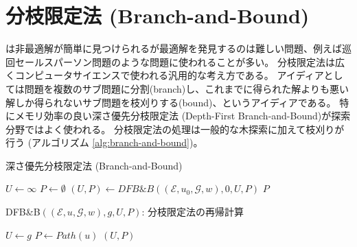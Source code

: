 \section{分枝限定法 (Branch-and-Bound)}
\label{sec:branch-and-bound}

は非最適解が簡単に見つけられるが最適解を発見するのは難しい問題、例えば巡回セールスパーソン問題のような問題に使われることが多い。
分枝限定法は広くコンピュータサイエンスで使われる汎用的な考え方である。
アイディアとしては問題を複数のサブ問題に分割(branch)し、これまでに得られた解よりも悪い解しか得られないサブ問題を枝刈りする(bound)、というアイディアである。
特にメモリ効率の良い深さ優先分枝限定法 (Depth-First Branch-and-Bound)が探索分野ではよく使われる。
分枝限定法の処理は一般的な木探索に加えて枝刈りが行う (アルゴリズム \ref{alg:branch-and-bound})。

\begin{algorithm}
\caption{深さ優先分枝限定法 (Branch-and-Bound)}
\label{alg:branch-and-bound}
	$U \leftarrow \infty$\;
	$P \leftarrow \emptyset$\;
	$(U, P) \leftarrow DFB\&B((\mathcal{E}, u_0, \mathcal{G}, w), 0, U, P)$\;
	\Return $P$\;
\end{algorithm}

\begin{algorithm}
\caption{DFB\&B$((\mathcal{E}, u, \mathcal{G}, w), g, U, P)$: 分枝限定法の再帰計算}
\label{alg:branch-and-bound-rec}
	 {
		 {
			$U \leftarrow g$\;
			$P \leftarrow Path(u)$\;
		}
	}
  \Return $(U, P)$
\end{algorithm}

